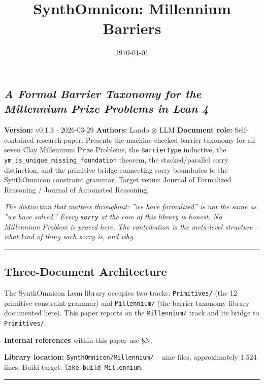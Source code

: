 \documentclass[12pt,a4paper]{article}
\newcommand{\pilcrow}{\S}
\begin{document}
\title{SynthOmnicon: Millennium Barriers}
\date{\today}

\maketitle

\subsection{\emph{A Formal Barrier Taxonomy for the Millennium Prize Problems in Lean 4}}

\textbf{Version:} v0.1.3 $\cdot$ 2026-03-29
\textbf{Authors:} Lando $\otimes$ LLM
\textbf{Document role:} Self-contained research paper. Presents the machine-checked barrier taxonomy for all seven Clay Millennium Prize Problems, the \texttt{BarrierType} inductive, the \texttt{ym\_is\_unique\_missing\_foundation} theorem, the stacked/parallel sorry distinction, and the primitive bridge connecting sorry boundaries to the SynthOmnicon constraint grammar. Target venue: Journal of Formalized Reasoning / Journal of Automated Reasoning.

\emph{The distinction that matters throughout: ''we have formalized'' is not the same as ''we have solved.'' Every \texttt{sorry} at the core of this library is honest. No Millennium Problem is proved here. The contribution is the meta-level structure  --  what kind of thing each sorry is, and why.}

\begin{center}
\rule{0.5\textwidth}{0.4pt}
\end{center}

\subsection{Three-Document Architecture}

The SynthOmnicon Lean library occupies two tracks: \texttt{Primitives/} (the 12-primitive constraint grammar) and \texttt{Millennium/} (the barrier taxonomy library documented here). This paper reports on the \texttt{Millennium/} track and its bridge to \texttt{Primitives/}.

\textbf{Internal references} within this paper use \pilcrow{}N.

\textbf{Library location:} \texttt{SynthOmnicon/Millennium/}  --  nine files, approximately 1,524 lines. Build target: \texttt{lake build Millennium}.

\begin{center}
\rule{0.5\textwidth}{0.4pt}
\end{center}
\end{document}
